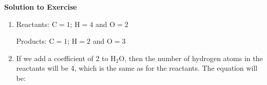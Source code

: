 {\begin{mdframed}[linewidth=4, leftmargin=40, rightmargin=40]
\begin{exercise}
        \par 
        
        \vspace{5pt}
        \label{m38726*solfhsst!!!underscore!!!id427}\noindent\textbf{Solution to Exercise } \label{m38726*listfhsst!!!underscore!!!id427}\begin{enumerate}[noitemsep, label=\textbf{Step} \textbf{\arabic*}. ] 
            \leftskip=20pt\rightskip=\leftskip\item  
        \label{m38726*id64139}Reactants: \begin{math}\mathrm{C}=1\end{math}; \begin{math}\mathrm{H}=4\end{math} and \begin{math}\mathrm{O}=2\end{math}\par 
        \label{m38726*id64142}Products: \begin{math}\mathrm{C}=1\end{math}; \begin{math}\mathrm{H}=2\end{math} and \begin{math}\mathrm{O}=3\end{math}\par 
        \item  
        \label{m38726*id64149}If we add a coefficient of 2 to \begin{math}\mathrm{H}{}_{2}\mathrm{O}\end{math}, then the number of hydrogen atoms in the reactants will be 4, which is the same as for the reactants. The equation will be:
       \label{m38726*id6852}\nopagebreak\noindent{}
\end{enumerate}
\end{exercise}
\end{mdframed}}
